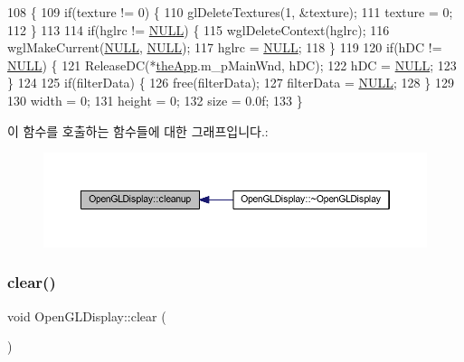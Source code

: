 \begin{DoxyCode}
108 \{
109     \textcolor{keywordflow}{if}(texture != 0) \{
110         glDeleteTextures(1, &texture);
111         texture = 0;
112     \}
113 
114     \textcolor{keywordflow}{if}(hglrc != \mbox{\hyperlink{getopt1_8c_a070d2ce7b6bb7e5c05602aa8c308d0c4}{NULL}}) \{
115         wglDeleteContext(hglrc);
116         wglMakeCurrent(\mbox{\hyperlink{getopt1_8c_a070d2ce7b6bb7e5c05602aa8c308d0c4}{NULL}}, \mbox{\hyperlink{getopt1_8c_a070d2ce7b6bb7e5c05602aa8c308d0c4}{NULL}});
117         hglrc = \mbox{\hyperlink{getopt1_8c_a070d2ce7b6bb7e5c05602aa8c308d0c4}{NULL}};
118     \}
119     
120     \textcolor{keywordflow}{if}(hDC != \mbox{\hyperlink{getopt1_8c_a070d2ce7b6bb7e5c05602aa8c308d0c4}{NULL}}) \{
121         ReleaseDC(*\mbox{\hyperlink{_v_b_a_8cpp_a8095a9d06b37a7efe3723f3218ad8fb3}{theApp}}.m\_pMainWnd, hDC);
122         hDC = \mbox{\hyperlink{getopt1_8c_a070d2ce7b6bb7e5c05602aa8c308d0c4}{NULL}};
123     \}
124     
125     \textcolor{keywordflow}{if}(filterData) \{
126         free(filterData);
127         filterData = \mbox{\hyperlink{getopt1_8c_a070d2ce7b6bb7e5c05602aa8c308d0c4}{NULL}};
128     \}
129     
130     width = 0;
131     height = 0;
132     size = 0.0f;
133 \}
\end{DoxyCode}
이 함수를 호출하는 함수들에 대한 그래프입니다.\+:
\nopagebreak
\begin{figure}[H]
\begin{center}
\leavevmode
\includegraphics[width=350pt]{class_open_g_l_display_a870bdc3cf12a50ff23755e1869f9026e_icgraph}
\end{center}
\end{figure}
\mbox{\label{class_open_g_l_display_abef343fb8d951b4bc63bd3b7afe285a2}} 
\subsubsection{\texorpdfstring{clear()}{clear()}}
{\footnotesize\ttfamily void Open\+G\+L\+Display\+::clear (\begin{DoxyParamCaption}{ }\end{DoxyParamCaption})\hspace{0.3cm}{\ttfamily [virtual]}}



